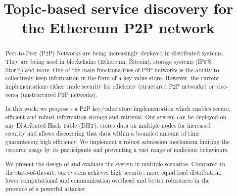 \documentclass[sigconf]{acmart}
\begin{document}
\title{Topic-based service discovery for the Ethereum P2P network}
\author{}


\begin{abstract}
Peer-to-Peer (P2P) Networks  are being increasingly deployed in distributed systems. They are being used in blockchains (Ethereum, Bitcoin), storage systems (IPFS, Stor4j) and more. One of the main functionalities of P2P networks is the ability to collectively keep information in the form of a key-value store. However, the current implementations either trade security for efficiency (structured P2P networks) or vice-versa (unstructured P2P networks). 

In this work, we propose \sysname - a P2P key/value store implementation which enables secure, efficient and robust information storage and retrieval. Our system can be deployed on any Distributed Hash Table (DHT). \sysname stores data on multiple nodes for increased security and allows discovering that data within a bounded amount of time guaranteeing high efficiency. We implement a robust admission mechanism limiting the resource usage by its participants and preventing a vast range of malicious behaviours. 

We present the design of \sysname and evaluate the system in multiple scenarios. Compared to the state-of-the-art, our system achieves high security, more equal load distribution, lower computational and communication overhead and better robustness in the presence of a powerful attacker.


\end{abstract}
\end{document}

